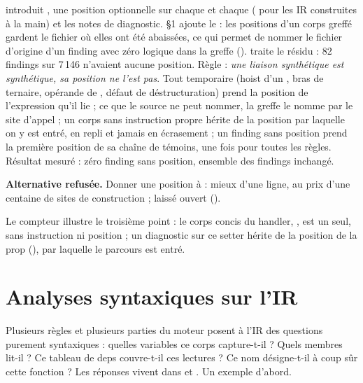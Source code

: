 \begin{decision}
\textbf{} introduit , une position optionnelle sur chaque  et chaque  ( pour les IR construites à la main) et les notes de diagnostic. \textbf{} §1 ajoute le  : les positions d'un corps greffé gardent le fichier où elles ont été abaissées, ce qui permet de nommer le fichier d'origine d'un finding \og avec zéro logique dans la greffe\fg{} (). \textbf{} traite le résidu : 82 findings sur 7\,146 n'avaient aucune position. Règle : \emph{une liaison synthétique est synthétique, sa position ne l'est pas}. Tout temporaire (hoist d'un , bras de ternaire, opérande de \code{||}, défaut de déstructuration) prend la position de l'expression qu'il lie ; ce que le source ne peut nommer, la greffe le nomme par le site d'appel ; un corps sans instruction propre hérite de la position par laquelle on y est entré, en repli et jamais en écrasement ; un finding sans position prend la première position de sa chaîne de témoins, une fois pour toutes les règles. Résultat mesuré : zéro finding sans position, ensemble des findings inchangé.

\textbf{Alternative refusée.} Donner une position à  : \og mieux d'une ligne, au prix d'une centaine de sites de construction\fg{} ; laissé ouvert ().
\end{decision}

Le compteur illustre le troisième point : le corps concis du handler, , est un  seul, sans instruction ni position ; un diagnostic sur ce setter hérite de la position de la prop  (), par laquelle le parcours est entré.

\section{Analyses syntaxiques sur l'IR}
\label{sec:ir-analyses}

Plusieurs règles et plusieurs parties du moteur posent à l'IR des questions purement syntaxiques : quelles variables ce corps capture-t-il ? Quels membres lit-il ? Ce tableau de deps couvre-t-il ces lectures ? Ce nom désigne-t-il à coup sûr cette fonction ? Les réponses vivent dans  et . Un exemple d'abord.

